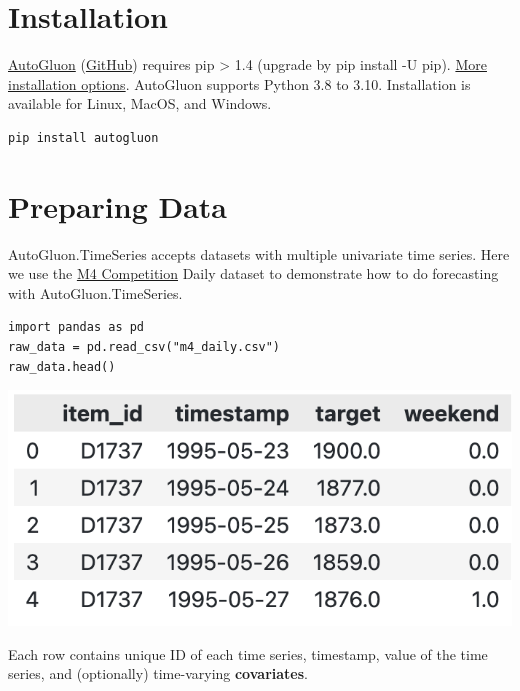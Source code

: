 \section*{Installation}
\href{https://auto.gluon.ai/stable/index.html}{AutoGluon} (\href{https://github.com/autogluon/autogluon/}{GitHub}) requires pip > 1.4 (upgrade by pip install -U pip). \href{https://auto.gluon.ai/stable/install.html}{More installation options}. AutoGluon supports Python 3.8 to 3.10. Installation is available for Linux, MacOS, and Windows.

\begin{verbatim}
pip install autogluon 
\end{verbatim}


\section*{Preparing Data}

AutoGluon.TimeSeries accepts datasets with multiple univariate time series. Here we use the \href{https://www.sciencedirect.com/science/article/pii/S0169207019301128}{M4 Competition} Daily dataset to demonstrate how to do forecasting with AutoGluon.TimeSeries.

\begin{verbatim}
import pandas as pd
raw_data = pd.read_csv("m4_daily.csv")
raw_data.head()
\end{verbatim}

\begin{center}
\includegraphics[width=0.6\linewidth]{timeseries/images/raw_data.png}
\end{center}

\medskip

Each row contains unique ID of each time series, timestamp, value of the time series, and (optionally) time-varying \textbf{covariates}.

